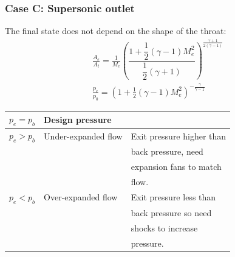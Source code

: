\subsubsection{Case C: Supersonic outlet}
The final state does not depend on the shape of the throat:
\begin{gather}
    \frac{A_e}{A_t} = \frac{1}{M_e}\left(\dfrac{1 + \dfrac{1}{2}\left(\gamma -1\right)M^2_e}{\dfrac{1}{2}\left(\gamma + 1\right)}\right)^{\frac{\gamma + 1}{2\left(\gamma -1\right)}}\\[5pt]
    \frac{p_e}{p_0} = \left(1 + \frac{1}{2}\left(\gamma -1\right)M^2_e\right)^{-\frac{\gamma}{\gamma - 1}}
\end{gather}
\begin{table}[H]
    \centering
    \begin{tabular}{@{}lll@{}}
        \toprule
        $p_e = p_b$ & Design pressure     &                           \\ \midrule
        $p_e > p_b$ & Under-expanded flow & Exit pressure higher than \\
                    &                     & back pressure, need       \\
                    &                     & expansion fans to match   \\ & & flow.                                              \\
        $p_e < p_b$ & Over-expanded flow  & Exit pressure less than   \\
                    &                     & back pressure so need     \\ & & shocks to increase \\ & & pressure. \\ \bottomrule
    \end{tabular}
\end{table}